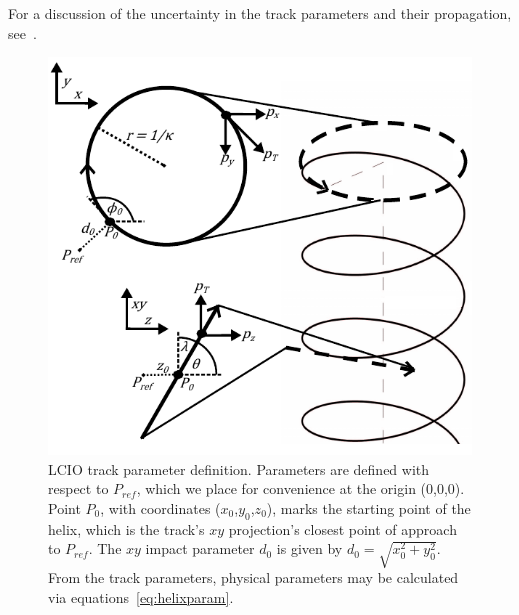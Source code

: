 For a discussion of the uncertainty in the track parameters and their propagation, see~\cite{Grefe:2014pba}.
\begin{figure}[t]
\centering
\includegraphics{helixDrawing3.pdf}
\caption{LCIO track parameter definition.
Parameters are defined with respect to $P_{ref}$, which we place
for convenience at the origin (0,0,0).
Point $P_{0}$, with coordinates ($x_{0}$,$y_{0}$,$z_{0}$), marks the starting point of the helix,
which is the track's $xy$ projection's closest point
of approach to $P_{ref}$. The $xy$ 
impact parameter $d_{0}$ is given by $d_{0} = \sqrt{x_{0}^{2}+y_{0}^{2}}$.
From the track parameters,
physical parameters may be calculated via equations~\ref{eq:helixparam}.}
\label{fig:helix}
\end{figure}

